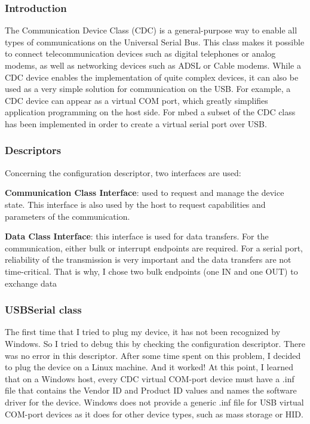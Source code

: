 \documentclass[pdftex,10pt,a4paper]{report}
\newenvironment{packed_item}{
\begin{itemize}
  \setlength{\itemsep}{1pt}
  \setlength{\parskip}{0pt}
  \setlength{\parsep}{0pt}
}{\end{itemize}}
\begin{document}
\subsubsection{Introduction}
The Communication Device Class (CDC) is a general-purpose way to enable all
types of communications on the Universal Serial Bus. This class makes it possible
to connect telecommunication devices such as digital telephones or analog
modems, as well as networking devices such as ADSL or Cable modems.
While a CDC device enables the implementation of quite complex devices, it can also
be used as a very simple solution for communication on the USB. For example, a CDC
device can appear as a virtual COM port, which greatly simplifies application programming
on the host side. For mbed a subset of the CDC class has been implemented in order to create
a virtual serial port over USB.

\subsubsection{Descriptors}
Concerning the configuration descriptor, two interfaces are used:
\begin{packed_item}
	\item \textbf{Communication Class Interface}: used to request and manage the device state. This interface is also used by the host to request capabilities and parameters of the communication. 
	\item \textbf{Data Class Interface}: this interface is used for data transfers. For the communication, either bulk or interrupt endpoints are required. For a serial port,  reliability
of the transmission is very important and the data transfers are not time-critical. That is why, I chose two bulk endpoints (one IN and one OUT) to exchange data
\end{packed_item}


\subsubsection{USBSerial class}
The first time that I tried to plug my device, it has not been recognized by Windows. So I tried to debug this by checking the configuration descriptor. There was no error in this descriptor. After some time spent on this problem, I decided to plug the device on a Linux machine. And it worked! At this point, I learned that on a Windows host, every CDC virtual COM-port device must have a .inf file that contains the Vendor ID and Product ID values and names the software driver for the device. Windows does not provide a generic .inf file for USB virtual COM-port devices as it does for other device types, such as mass storage or HID. \\
\end{document}
